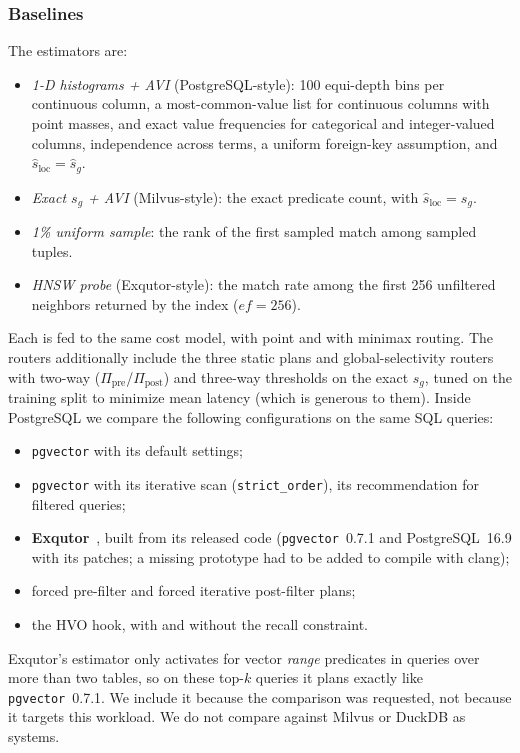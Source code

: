 \documentclass[sigconf,nonacm]{acmart}
\newcommand{\sg}{s_g}
\newcommand{\Ppre}{\Pi_{\text{pre}}}
\newcommand{\Ppost}{\Pi_{\text{post}}}
\begin{document}
\subsubsection{Baselines}
The estimators are:
\begin{itemize}
    \item \emph{1-D histograms + AVI} (PostgreSQL-style): 100 equi-depth bins per continuous column, a most-common-value list for continuous columns with point masses, and exact value frequencies for categorical and integer-valued columns, independence across terms, a uniform foreign-key assumption, and $\hat s_{\text{loc}}=\hat s_g$.
    \item \emph{Exact $s_g$ + AVI} (Milvus-style): the exact predicate count, with $\hat s_{\text{loc}}=\sg$.
    \item \emph{1\% uniform sample}: the rank of the first sampled match among sampled tuples.
    \item \emph{HNSW probe} (Exqutor-style): the match rate among the first 256 unfiltered neighbors returned by the index ($ef=256$).
\end{itemize}
Each is fed to the same cost model, with point and with minimax routing. The routers additionally include the three static plans and global-selectivity routers with two-way ($\Ppre$/$\Ppost$) and three-way thresholds on the exact $\sg$, tuned on the training split to minimize mean latency (which is generous to them). Inside PostgreSQL we compare the following configurations on the same SQL queries:
\begin{itemize}
    \item \texttt{pgvector} with its default settings;
    \item \texttt{pgvector} with its iterative scan (\texttt{strict\_order}), its recommendation for filtered queries;
    \item \textbf{Exqutor}~\cite{exqutor2026}, built from its released code (\texttt{pgvector}~0.7.1 and PostgreSQL~16.9 with its patches; a missing prototype had to be added to compile with clang);
    \item forced pre-filter and forced iterative post-filter plans;
    \item the HVO hook, with and without the recall constraint.
\end{itemize}
Exqutor's estimator only activates for vector \emph{range} predicates in queries over more than two tables, so on these top-$k$ queries it plans exactly like \texttt{pgvector}~0.7.1. We include it because the comparison was requested, not because it targets this workload. We do not compare against Milvus or DuckDB as systems.
\end{document}
